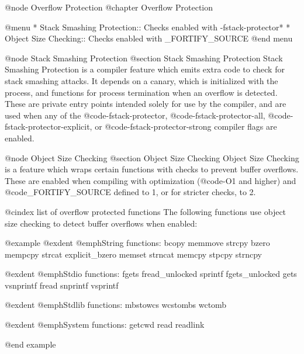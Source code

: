 @node Overflow Protection
@chapter Overflow Protection

@menu
* Stack Smashing Protection::    Checks enabled with -fstack-protector*
* Object Size Checking::         Checks enabled with _FORTIFY_SOURCE
@end menu

@node Stack Smashing Protection
@section Stack Smashing Protection
Stack Smashing Protection is a compiler feature which emits extra code
to check for stack smashing attacks.  It depends on a canary, which is
initialized with the process, and functions for process termination when
an overflow is detected.  These are private entry points intended solely
for use by the compiler, and are used when any of the @code{-fstack-protector},
@code{-fstack-protector-all}, @code{-fstack-protector-explicit}, or
@code{-fstack-protector-strong} compiler flags are enabled.

@node Object Size Checking
@section Object Size Checking
Object Size Checking is a feature which wraps certain functions with checks
to prevent buffer overflows.  These are enabled when compiling with
optimization (@code{-O1} and higher) and @code{_FORTIFY_SOURCE} defined
to 1, or for stricter checks, to 2.

@cindex list of overflow protected functions
The following functions use object size checking to detect buffer overflows
when enabled:

@example
@exdent @emph{String functions:}
bcopy           memmove         strcpy
bzero           mempcpy         strcat
explicit_bzero  memset          strncat
memcpy          stpcpy          strncpy

@exdent @emph{Stdio functions:}
fgets           fread_unlocked  sprintf
fgets_unlocked  gets            vsnprintf
fread           snprintf        vsprintf

@exdent @emph{Stdlib functions:}
mbstowcs        wcstombs        wctomb

@exdent @emph{System functions:}
getcwd          read            readlink

@end example
